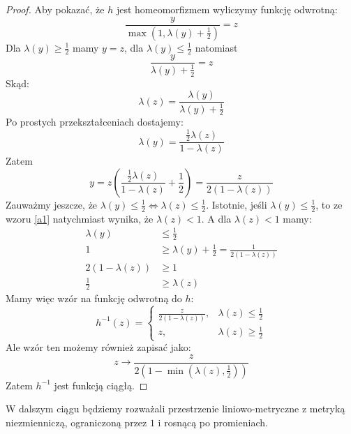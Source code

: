 \begin{lem}
\begin{proof}
    Aby pokazać, że $h$ jest homeomorfizmem wyliczymy funkcję odwrotną:
    \[
      \frac{y}{\max\left(1, \lambda(y) + \frac{1}{2}\right)} = z
    \]
    Dla $\lambda(y) \geq \frac{1}{2}$ mamy $y = z$, dla $\lambda(y) \leq \frac{1}{2}$ natomiast 
    \[
      \frac{y}{\lambda(y) + \frac{1}{2}} = z
    \]
    Skąd:
    \begin{equation}
      \label{a1}
      \lambda(z) = \frac{\lambda(y)}{\lambda(y) + \frac{1}{2}}
    \end{equation}
    Po prostych przekształceniach dostajemy:
    \[
      \lambda(y) = \frac{\frac{1}{2} \lambda(z)}{1 - \lambda(z)}
    \]
    Zatem
    \[
      y = z\left(\frac{\frac{1}{2} \lambda(z)}{1 - \lambda(z)} + \frac{1}{2}\right) = \frac{z}{2(1-\lambda(z))}
    \]
    Zauważmy jeszcze, że $\lambda(y) \leq \frac{1}{2} \iff \lambda(z) \leq \frac{1}{2}$. Istotnie, jeśli $\lambda(y) \leq \frac{1}{2}$, to ze wzoru \eqref{a1} natychmiast wynika, że $\lambda(z) < 1$. A dla $\lambda(z) < 1$ mamy:
    \begin{align*}
      \lambda(y) &\leq \frac{1}{2} \\
      1 &\geq \lambda(y) + \frac{1}{2} = \frac{1}{2(1-\lambda(z))} \\
      2(1-\lambda(z)) &\geq 1 \\
      \frac{1}{2} &\geq \lambda(z)
    \end{align*}
    Mamy więc wzór na funkcję odwrotną do $h$:
    \[
      h^{-1}(z) = 
      \begin{cases}
        \frac{z}{2(1-\lambda(z))},&\lambda(z) \leq \frac{1}{2} \\
        z,&\lambda(z) \geq \frac{1}{2}
      \end{cases}
    \]
    Ale wzór ten możemy również zapisać jako:
    \[
      z \to \frac{z}{2(1-\min(\lambda(z), \frac{1}{2}))}
    \]
    Zatem $h^{-1}$ jest funkcją ciągłą.
  \end{proof}
\end{lem}

W dalszym ciągu będziemy rozważali przestrzenie liniowo-metryczne z metryką niezmienniczą, ograniczoną przez $1$ i rosnącą po promieniach.


